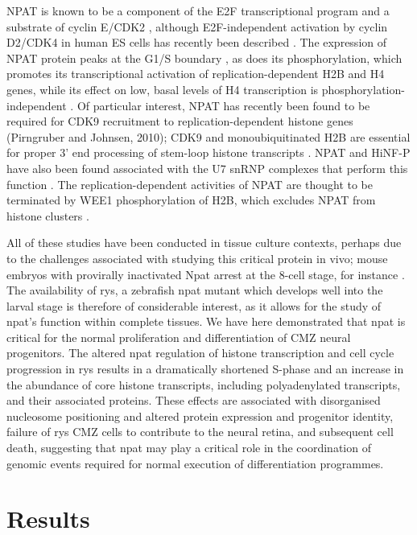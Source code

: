 NPAT is known to be a component of the E2F transcriptional program \cite{Gao2003} and a substrate of cyclin E/CDK2 \cite{Zhao1998}, although E2F-independent activation by cyclin D2/CDK4 in human ES cells has recently been described \cite{Becker2010}. The expression of NPAT protein peaks at the G1/S boundary \cite{Zhao1998}, as does its phosphorylation, which promotes its transcriptional activation of replication-dependent H2B \cite{Ma2000} and H4 \cite{Mitra2009} genes, while its effect on low, basal levels of H4 transcription is phosphorylation-independent \cite{Ye2003}. Of particular interest, NPAT has recently been found to be required for CDK9 recruitment to replication-dependent histone genes (Pirngruber and Johnsen, 2010); CDK9 and monoubiquitinated H2B are essential for proper 3’ end processing of stem-loop histone transcripts \cite{Pirngruber2009}. NPAT and HiNF-P have also been found associated with the U7 snRNP complexes that perform this function \cite{Ghule2009}. The replication-dependent activities of NPAT are thought to be terminated by WEE1 phosphorylation of H2B, which excludes NPAT from histone clusters \cite{Mahajan2012}.

All of these studies have been conducted in tissue culture contexts, perhaps due to the challenges associated with studying this critical protein in vivo; mouse embryos with provirally inactivated Npat arrest at the 8-cell stage, for instance \cite{DiFruscio1997}. The availability of rys, a zebrafish npat mutant which develops well into the larval stage is therefore of considerable interest, as it allows for the study of npat’s function within complete tissues. We have here demonstrated that npat is critical for the normal proliferation and differentiation of CMZ neural progenitors. The altered npat regulation of histone transcription and cell cycle progression in rys results in a dramatically shortened S-phase and an increase in the abundance of core histone transcripts, including polyadenylated transcripts, and their associated proteins. These effects are associated with disorganised nucleosome positioning and altered protein expression and progenitor identity, failure of rys CMZ cells to contribute to the neural retina, and subsequent cell death, suggesting that npat may play a critical role in the coordination of genomic events required for normal execution of differentiation programmes.

\section{Results}
